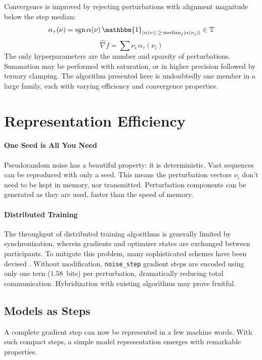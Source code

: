 \documentclass{article}
\begin{document}
Convergence is improved by rejecting perturbations with alignment magnitude below the step median:
\begin{equation}
  \alpha_{\tau}(\nu) = \operatorname{sgn} \alpha(\nu) \, \mathbbm{1}_{\lvert\alpha(\nu)\lvert \, \ge \, \operatorname{median}_j \lvert\alpha(\nu_j)\lvert} \in \mathbb{T}
\end{equation}
\begin{equation}
  \widehat{\nabla} f = \sum{\nu_i \, \alpha_{\tau}(\nu_i)}
\end{equation}
The only hyperparameters are the number and sparsity of perturbations.
Summation may be performed with saturation, or in higher precision followed by ternary clamping.
The algorithm presented here is undoubtedly one member in a large family, each with varying efficiency and convergence properties.

\newpage

\section{Representation Efficiency}
\paragraph{One Seed is All You Need}
Pseudorandom noise has a beautiful property: it is deterministic. Vast sequences can be reproduced with only a seed. 
This means the perturbation vectors $\nu_i$ don't need to be kept in memory, nor transmitted. 
Perturbation components can be generated as they are used, faster than the speed of memory.

\paragraph{Distributed Training}
The throughput of distributed training algorithms is generally limited by synchronization, wherein gradients and optimizer states are exchanged between participants.
To mitigate this problem, many sophisticated schemes have been devised \cite{Langer_2020}.
Without modification, \texttt{noise\_step} gradient steps are encoded using only one tern ($1.58$~bits) per perturbation, dramatically reducing total communication.
Hybridization with existing algorithms may prove fruitful.

\subsection{Models as Steps}
A complete gradient step can now be represented in a few machine words.
With such compact steps, a simple model representation emerges with remarkable properties.
\end{document}
